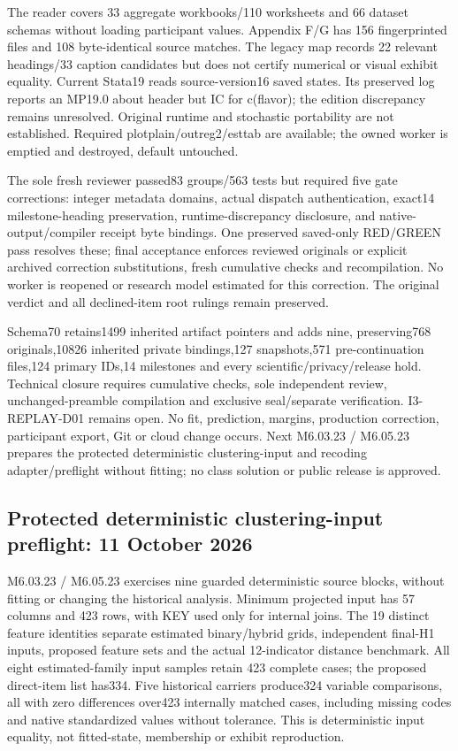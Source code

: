 \documentclass[11pt,a4paper]{article}
\begin{document}
The reader covers 33 aggregate workbooks/110 worksheets and 66 dataset schemas without loading participant values. Appendix F/G has 156 fingerprinted files and 108 byte-identical source matches. The legacy map records 22 relevant headings/33 caption candidates but does not certify numerical or visual exhibit equality. Current Stata19 reads source-version16 saved states. Its preserved log reports an MP19.0 about header but IC for c(flavor); the edition discrepancy remains unresolved. Original runtime and stochastic portability are not established. Required plotplain/outreg2/esttab are available; the owned worker is emptied and destroyed, default untouched.

The sole fresh reviewer passed83 groups/563 tests but required five gate corrections: integer metadata domains, actual dispatch authentication, exact14 milestone-heading preservation, runtime-discrepancy disclosure, and native-output/compiler receipt byte bindings. One preserved saved-only RED/GREEN pass resolves these; final acceptance enforces reviewed originals or explicit archived correction substitutions, fresh cumulative checks and recompilation. No worker is reopened or research model estimated for this correction. The original verdict and all declined-item root rulings remain preserved.

Schema70 retains1499 inherited artifact pointers and adds nine, preserving768 originals,10826 inherited private bindings,127 snapshots,571 pre-continuation files,124 primary IDs,14 milestones and every scientific/privacy/release hold. Technical closure requires cumulative checks, sole independent review, unchanged-preamble compilation and exclusive seal/separate verification. I3-REPLAY-D01 remains open. No fit, prediction, margins, production correction, participant export, Git or cloud change occurs. Next M6.03.23 / M6.05.23 prepares the protected deterministic clustering-input and recoding adapter/preflight without fitting; no class solution or public release is approved.
\subsection*{Protected deterministic clustering-input preflight: 11 October 2026}
M6.03.23 / M6.05.23 exercises nine guarded deterministic source blocks, without fitting or changing the historical analysis. Minimum projected input has 57 columns and 423 rows, with KEY used only for internal joins. The 19 distinct feature identities separate estimated binary/hybrid grids, independent final-H1 inputs, proposed feature sets and the actual 12-indicator distance benchmark. All eight estimated-family input samples retain 423 complete cases; the proposed direct-item list has334. Five historical carriers produce324 variable comparisons, all with zero differences over423 internally matched cases, including missing codes and native standardized values without tolerance. This is deterministic input equality, not fitted-state, membership or exhibit reproduction.
\end{document}
